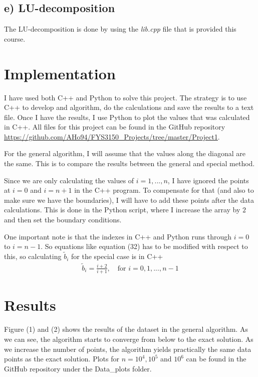 \documentclass[12pt]{article}
\begin{document}
\subsection*{e) LU-decomposition}
The LU-decomposition is done by using the \textit{lib.cpp} file that is provided this course. 

\section{Implementation}
I have used both C++ and Python to solve this project. The strategy is to use C++ to develop and algorithm, do the calculations and save the results to a text file. Once I have the results, I use Python to plot the values that was calculated in C++. All files for this project can be found in the GitHub repository \url{https://github.com/AHo94/FYS3150_Projects/tree/master/Project1}.

For the general algorithm, I will assume that the values along the diagonal are the same. This is to compare the results between the general and special method.

Since we are only calculating the values of $i=1,...,n$, I have ignored the points at $i=0$ and $i=n+1$ in the C++ program. To compensate for that (and also to make sure we have the boundaries), I will have to add these points after the data calculations. This is done in the Python script, where I increase the array by $2$ and then set the boundary conditions.

One important note is that the indexes in C++ and Python runs through $i=0$ to $i=n-1$. So equations like equation (32) has to be modified with respect to this, so calculating   $\tilde{b}_i$ for the special case is in C++
\begin{align}
\tilde{b}_i = \frac{i+2}{i+1}, \quad \text{for } i=0,1,...,n-1
\end{align}

\section{Results}
Figure (1) and (2) shows the results of the dataset in the general algorithm. As we can see, the algorithm starts to converge from below to the exact solution. As we increase the number of points, the algorithm yields practically the same data points as the exact solution. Plots for $n=10^4, 10^5$ and $10^6$ can be found in the GitHub repository under  the Data\_plots folder.
\end{document}
